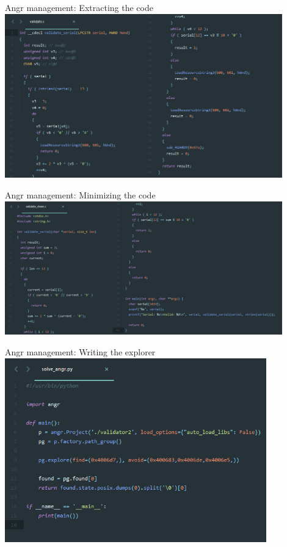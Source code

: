 \documentclass[10pt, compress, aspectratio=169]{beamer}
\begin{document}
\begin{frame}{Angr management: Extracting the code}
	\includegraphics[width=0.9\textwidth]{images/sc1-7-validator-split.png}
\end{frame}

\begin{frame}{Angr management: Minimizing the code}
	\includegraphics[width=0.9\textwidth]{images/sc1-8-validator-clean-split.png}
\end{frame}

\begin{frame}{Angr management: Writing the explorer}
	\includegraphics[width=0.85\textwidth]{images/sc1-9-angr.png}
\end{frame}
\end{document}
